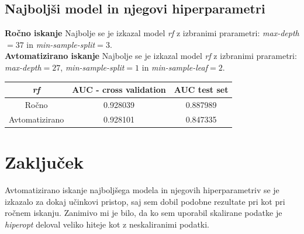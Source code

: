 \documentclass[12pt]{article}
\begin{document}
\subsection{Najboljši model in njegovi hiperparametri}
\textbf{Ročno iskanje} Najbolje se je izkazal model \emph{rf} z izbranimi prarametri: 
\emph{max-depth}$=37$ in \emph{min-sample-split}$=3$.\\
\textbf{Avtomatizirano iskanje} Najbolje se je izkazal model \emph{rf} z izbranimi prarametri: 
\emph{max-depth}$=27$, \emph{min-sample-split}$=1$ in \emph{min-sample-leaf}$=2$.
\begin{center}
    \begin{tabular}{||c| c c||} 
        \hline
        \emph{rf}  & AUC - cross validation &  AUC test set  \\ [0.5ex] 
        \hline\hline
        Ročno & 0.928039  & 0.887989 \\
        \hline
        Avtomatizirano & 0.928101 & 0.847335\\
        \hline
    \end{tabular}
\end{center}


\section{Zaključek}

Avtomatizirano iskanje najboljšega modela in njegovih hiperparametriv se je izkazalo za 
dokaj učinkovi pristop, saj sem dobil podobne rezultate pri kot pri ročnem iskanju. 
Zanimivo mi je bilo, da ko sem uporabil skalirane podatke je \emph{hiperopt} deloval veliko 
hiteje kot z neskaliranimi podatki.
\end{document}
